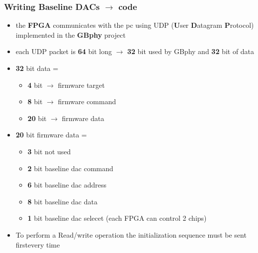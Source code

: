 \documentclass[aspectratio=169]{beamer}
\begin{document}
	\begin{frame}[fragile]
	\frametitle{Writing Baseline DACs $\rightarrow$ code}
	\begin{itemize}
		\item the \textbf{FPGA} communicates with the pc using UDP (\textbf{U}ser \textbf{D}atagram \textbf{P}rotocol) implemented in the \textbf{GBphy} project
		\item each UDP packet is \textbf{64} bit long $\rightarrow$ \textbf{32} bit used by GBphy and \textbf{32} bit of data
		\item \textbf{32} bit data =
		\begin{itemize}
			\item \textbf{4} bit $\rightarrow$ firmware target
			\item \textbf{8} bit $\rightarrow$ firmware command
			\item \textbf{20} bit $\rightarrow$ firmware data
		\end{itemize}
		\item \textbf{20} bit firmware data =
		\begin{itemize}
			\item \textbf{3} bit not used
			\item \textbf{2} bit baseline dac command
			\item \textbf{6} bit baseline dac address
			\item \textbf{8} bit baseline dac data
			\item \textbf{1} bit baseline dac selecet (each FPGA can control 2 chips)
		\end{itemize}
		\item To perform a Read/write operation the initialization sequence must be sent first\newline every time
	\end{itemize}
	\end{frame}
\end{document}
